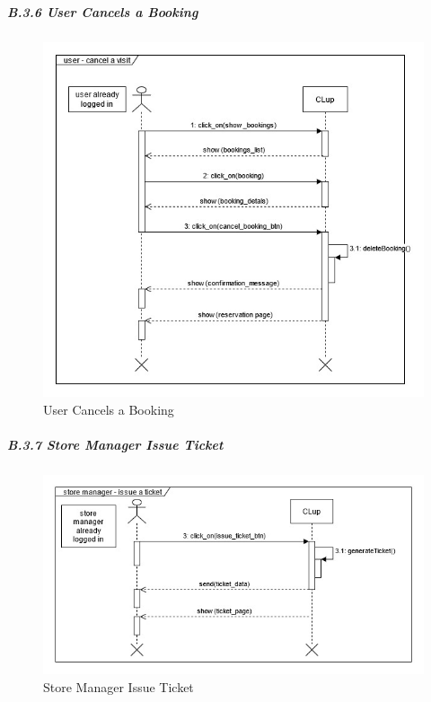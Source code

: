 \documentclass[
]{article}
\begin{document}
\hypertarget{b.3.6-user-cancels-a-booking}{%
\subparagraph{\texorpdfstring{B.3.6 User Cancels a Booking
}{B.3.6 User Cancels a Booking }}\label{b.3.6-user-cancels-a-booking}}

\begin{figure}
\centering
\includegraphics{assets/rasd/sequence_diagrams/sequence_diagram_user_cancel_booking.jpg}
\caption{User Cancels a Booking}
\end{figure}

\hypertarget{b.3.7-store-manager-issue-ticket}{%
\subparagraph{\texorpdfstring{B.3.7 Store Manager Issue Ticket
}{B.3.7 Store Manager Issue Ticket }}\label{b.3.7-store-manager-issue-ticket}}

\begin{figure}
\centering
\includegraphics{assets/rasd/sequence_diagrams/sequence_diagram_store_manager_issue_ticket.jpg}
\caption{Store Manager Issue Ticket}
\end{figure}
\end{document}
